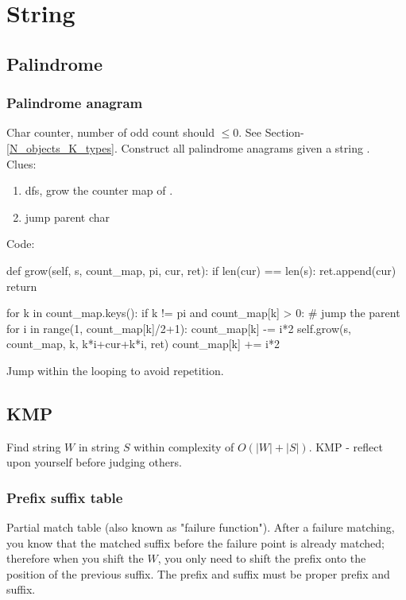 \chapter{String}

\section{Palindrome}
\subsection{Palindrome anagram}
 Char counter, number of odd count should $\leq 0$.
 See Section-\ref{N_objects_K_types}.
 Construct all palindrome anagrams given a string .
\\
Clues:
\begin{enumerate}
\item dfs, grow the counter map of . 
\item jump parent char
\end{enumerate}
Code:
\begin{python}
def grow(self, s, count_map, pi, cur, ret):
  if len(cur) == len(s):
    ret.append(cur)
    return

  for k in count_map.keys():
    if k != pi and count_map[k] > 0:
      # jump the parent
      for i in range(1, count_map[k]/2+1):
        count_map[k] -= i*2
        self.grow(s, count_map, k, k*i+cur+k*i, ret)
        count_map[k] += i*2
\end{python}

Jump within the looping to avoid repetition. 

\section{KMP}
Find string $W$ in string $S$ within complexity of $O(|W|+|S|)$. KMP - reflect upon yourself before judging others.
\subsection{Prefix suffix table}
Partial match table (also known as "failure function"). After a failure matching, you know that the matched suffix before the failure point is already matched; therefore when you shift the $W$, you only need to shift the prefix onto the position of the previous suffix. The prefix and suffix must be proper prefix and suffix.

